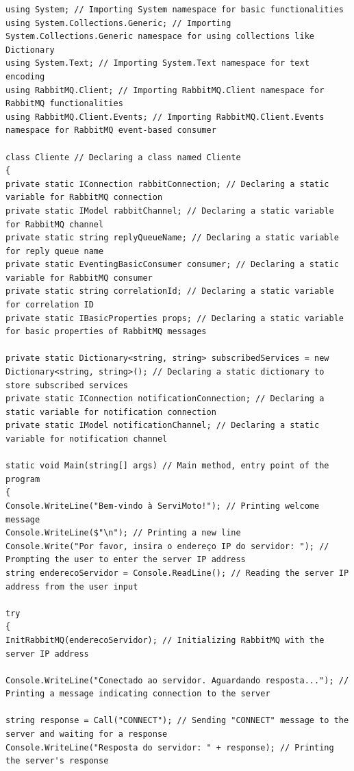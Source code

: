 \documentclass[12pt]{article}
\begin{document}
\tiny{
\begin{verbatim}
using System; // Importing System namespace for basic functionalities
using System.Collections.Generic; // Importing System.Collections.Generic namespace for using collections like Dictionary
using System.Text; // Importing System.Text namespace for text encoding
using RabbitMQ.Client; // Importing RabbitMQ.Client namespace for RabbitMQ functionalities
using RabbitMQ.Client.Events; // Importing RabbitMQ.Client.Events namespace for RabbitMQ event-based consumer

class Cliente // Declaring a class named Cliente
{
private static IConnection rabbitConnection; // Declaring a static variable for RabbitMQ connection
private static IModel rabbitChannel; // Declaring a static variable for RabbitMQ channel
private static string replyQueueName; // Declaring a static variable for reply queue name
private static EventingBasicConsumer consumer; // Declaring a static variable for RabbitMQ consumer
private static string correlationId; // Declaring a static variable for correlation ID
private static IBasicProperties props; // Declaring a static variable for basic properties of RabbitMQ messages

private static Dictionary<string, string> subscribedServices = new Dictionary<string, string>(); // Declaring a static dictionary to store subscribed services
private static IConnection notificationConnection; // Declaring a static variable for notification connection
private static IModel notificationChannel; // Declaring a static variable for notification channel

static void Main(string[] args) // Main method, entry point of the program
{
Console.WriteLine("Bem-vindo à ServiMoto!"); // Printing welcome message
Console.WriteLine($"\n"); // Printing a new line
Console.Write("Por favor, insira o endereço IP do servidor: "); // Prompting the user to enter the server IP address
string enderecoServidor = Console.ReadLine(); // Reading the server IP address from the user input

try
{
InitRabbitMQ(enderecoServidor); // Initializing RabbitMQ with the server IP address

Console.WriteLine("Conectado ao servidor. Aguardando resposta..."); // Printing a message indicating connection to the server

string response = Call("CONNECT"); // Sending "CONNECT" message to the server and waiting for a response
Console.WriteLine("Resposta do servidor: " + response); // Printing the server's response


\end{verbatim}}
\end{document}
